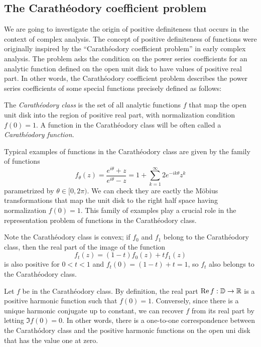 \documentclass[a4paper]{article}
\begin{document}
\subsection{The Carath\'eodory coefficient problem}

We are going to investigate the origin of positive definiteness that occurs in the context of complex analysis.
The concept of positive definiteness of functions were originally inspired by the ``Carath\'eodory coefficient problem'' in early complex analysis.
The problem asks the condition on the power series coefficients for an analytic function defined on the open unit disk to have values of positive real part.
In other words, the Carath\'eodory coefficient problem describes the power series coefficients of some special functions precisely defined as follows:

\begin{defn}
The \emph{Carath\'eodory class} is the set of all analytic functions $f$ that map the open unit disk into the region of positive real part, with normalization condition $f(0)=1$.
A function in the Carath\'eodory class will be often called a \emph{Carath\'eodory function}.
\end{defn}

\begin{ex}
Typical examples of functions in the Carath\'eodory class are given by the family of functions
\[f_\theta(z)=\frac{e^{i\theta}+z}{e^{i\theta}-z}=1+\sum_{k=1}^\infty2e^{-ik\theta}z^k\]
parametrized by $\theta\in[0,2\pi)$.
We can check they are eactly the M\"obius transformations that map the unit disk to the right half space having normalization $f(0)=1$.
This family of examples play a crucial role in the representation problem of functions in the Carath\'eodory class.
\end{ex}

\begin{ex}
Note the Carath\'eodory class is convex; if $f_0$ and $f_1$ belong to the Carath\'eodory class, then the real part of the image of the function
\[f_t(z)=(1-t)f_0(z)+tf_1(z)\]
is also positive for $0<t<1$ and $f_t(0)=(1-t)+t=1$, so $f_t$ also belongs to the Carath\'eodory class.
\end{ex}

\begin{ex}
Let $f$ be in the Carath\'eodory class.
By definition, the real part $\operatorname{Re} f:\mathbb{D}\to\mathbb{R}$ is a positive harmonic function such that $f(0)=1$.
Conversely, since there is a unique harmonic conjugate up to constant, we can recover $f$ from its real part by letting $\Im f(0)=0$.
In other words, there is a one-to-one correspondence between the Carath\'odory class and the positive harmonic functions on the open uni disk that has the value one at zero.
\end{ex}
\end{document}
